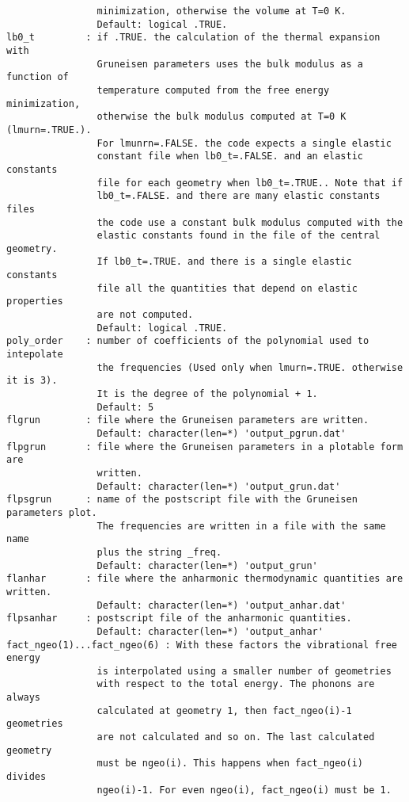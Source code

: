 \documentclass[12pt,a4paper]{article}
\begin{document}
\begin{verbatim}
                minimization, otherwise the volume at T=0 K.
                Default: logical .TRUE.
lb0_t         : if .TRUE. the calculation of the thermal expansion with 
                Gruneisen parameters uses the bulk modulus as a function of 
                temperature computed from the free energy minimization, 
                otherwise the bulk modulus computed at T=0 K (lmurn=.TRUE.). 
                For lmunrn=.FALSE. the code expects a single elastic 
                constant file when lb0_t=.FALSE. and an elastic constants
                file for each geometry when lb0_t=.TRUE.. Note that if
                lb0_t=.FALSE. and there are many elastic constants files
                the code use a constant bulk modulus computed with the
                elastic constants found in the file of the central geometry. 
                If lb0_t=.TRUE. and there is a single elastic constants 
                file all the quantities that depend on elastic properties 
                are not computed.
                Default: logical .TRUE.
poly_order    : number of coefficients of the polynomial used to intepolate 
                the frequencies (Used only when lmurn=.TRUE. otherwise it is 3).
                It is the degree of the polynomial + 1.
                Default: 5
flgrun        : file where the Gruneisen parameters are written. 
                Default: character(len=*) 'output_pgrun.dat'
flpgrun       : file where the Gruneisen parameters in a plotable form are
                written.
                Default: character(len=*) 'output_grun.dat'
flpsgrun      : name of the postscript file with the Gruneisen parameters plot.
                The frequencies are written in a file with the same name 
                plus the string _freq.
                Default: character(len=*) 'output_grun'
flanhar       : file where the anharmonic thermodynamic quantities are written.
                Default: character(len=*) 'output_anhar.dat'
flpsanhar     : postscript file of the anharmonic quantities.
                Default: character(len=*) 'output_anhar'
fact_ngeo(1)...fact_ngeo(6) : With these factors the vibrational free energy 
                is interpolated using a smaller number of geometries 
                with respect to the total energy. The phonons are always 
                calculated at geometry 1, then fact_ngeo(i)-1 geometries 
                are not calculated and so on. The last calculated geometry 
                must be ngeo(i). This happens when fact_ngeo(i) divides
                ngeo(i)-1. For even ngeo(i), fact_ngeo(i) must be 1.

\end{verbatim}
\end{document}

